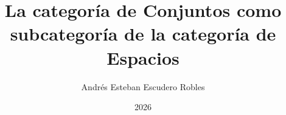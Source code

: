 \documentclass{tesisFC}
\title{La categoría de Conjuntos como subcategoría de la categoría de Espacios}
\author{Andrés Esteban Escudero Robles}
\date{2026}
\begin{document}
\frontmatter
\portadatesis
\tableofcontents*


\mainmatter







\backmatter
\printbibliography
\end{document}
